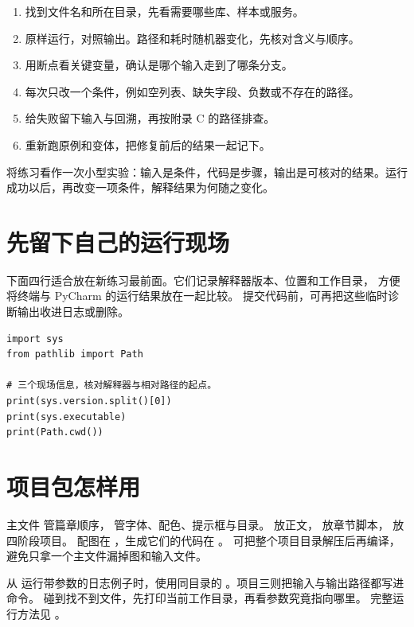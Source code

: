 \begin{enumerate}
  \item 找到文件名和所在目录，先看需要哪些库、样本或服务。
  \item 原样运行，对照输出。路径和耗时随机器变化，先核对含义与顺序。
  \item 用断点看关键变量，确认是哪个输入走到了哪条分支。
  \item 每次只改一个条件，例如空列表、缺失字段、负数或不存在的路径。
  \item 给失败留下输入与回溯，再按附录 C 的路径排查。
  \item 重新跑原例和变体，把修复前后的结果一起记下。
\end{enumerate}

\begin{myunderstanding}
将练习看作一次小型实验：输入是条件，代码是步骤，输出是可核对的结果。运行成功以后，再改变一项条件，解释结果为何随之变化。
\end{myunderstanding}

\section*{先留下自己的运行现场}

下面四行适合放在新练习最前面。它们记录解释器版本、位置和工作目录，
方便将终端与 PyCharm 的运行结果放在一起比较。
提交代码前，可再把这些临时诊断输出收进日志或删除。
\begin{lstlisting}[title={\code{check_environment.py}}]
import sys
from pathlib import Path

# 三个现场信息，核对解释器与相对路径的起点。
print(sys.version.split()[0])
print(sys.executable)
print(Path.cwd())
\end{lstlisting}

\section*{项目包怎样用}

主文件  管篇章顺序， 管字体、配色、提示框与目录。
 放正文， 放章节脚本， 放四阶段项目。
配图在 ，生成它们的代码在 。
可把整个项目目录解压后再编译，避免只拿一个主文件漏掉图和输入文件。

从  运行带参数的日志例子时，使用同目录的
。项目三则把输入与输出路径都写进命令。
碰到找不到文件，先打印当前工作目录，再看参数究竟指向哪里。
完整运行方法见 。

